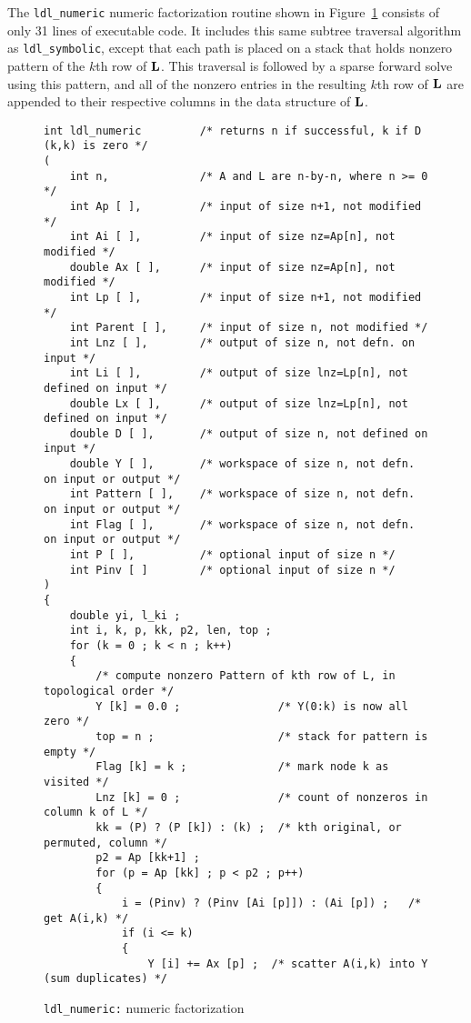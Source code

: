 \documentclass[12pt]{article}
\newcommand{\m}[1]{{\bf{#1}}}       %
\begin{document}
The {\tt ldl\_numeric} numeric factorization routine shown
in Figure~\ref{ldlnumeric} consists of only 31 lines of
executable code.  It includes this same subtree traversal algorithm
as {\tt ldl\_symbolic},
except that each path is placed on a stack that holds
nonzero pattern of the $k$th row of $\m{L}$.
This traversal is followed by a sparse forward solve
using this pattern, and all of the nonzero entries in
the resulting $k$th row of $\m{L}$ are appended to their respective columns
in the data structure of $\m{L}$.

\begin{figure}
\caption{{\tt ldl\_numeric:} numeric factorization}
\label{ldlnumeric}
{\scriptsize
\begin{verbatim}
int ldl_numeric         /* returns n if successful, k if D (k,k) is zero */
(
    int n,              /* A and L are n-by-n, where n >= 0 */
    int Ap [ ],         /* input of size n+1, not modified */
    int Ai [ ],         /* input of size nz=Ap[n], not modified */
    double Ax [ ],      /* input of size nz=Ap[n], not modified */
    int Lp [ ],         /* input of size n+1, not modified */
    int Parent [ ],     /* input of size n, not modified */
    int Lnz [ ],        /* output of size n, not defn. on input */
    int Li [ ],         /* output of size lnz=Lp[n], not defined on input */
    double Lx [ ],      /* output of size lnz=Lp[n], not defined on input */
    double D [ ],       /* output of size n, not defined on input */
    double Y [ ],       /* workspace of size n, not defn. on input or output */
    int Pattern [ ],    /* workspace of size n, not defn. on input or output */
    int Flag [ ],       /* workspace of size n, not defn. on input or output */
    int P [ ],          /* optional input of size n */
    int Pinv [ ]        /* optional input of size n */
)
{
    double yi, l_ki ;
    int i, k, p, kk, p2, len, top ;
    for (k = 0 ; k < n ; k++)
    {
        /* compute nonzero Pattern of kth row of L, in topological order */
        Y [k] = 0.0 ;               /* Y(0:k) is now all zero */
        top = n ;                   /* stack for pattern is empty */
        Flag [k] = k ;              /* mark node k as visited */
        Lnz [k] = 0 ;               /* count of nonzeros in column k of L */
        kk = (P) ? (P [k]) : (k) ;  /* kth original, or permuted, column */
        p2 = Ap [kk+1] ;
        for (p = Ap [kk] ; p < p2 ; p++)
        {
            i = (Pinv) ? (Pinv [Ai [p]]) : (Ai [p]) ;   /* get A(i,k) */
            if (i <= k)
            {
                Y [i] += Ax [p] ;  /* scatter A(i,k) into Y (sum duplicates) */

\end{verbatim}}
\end{figure}
\end{document}
